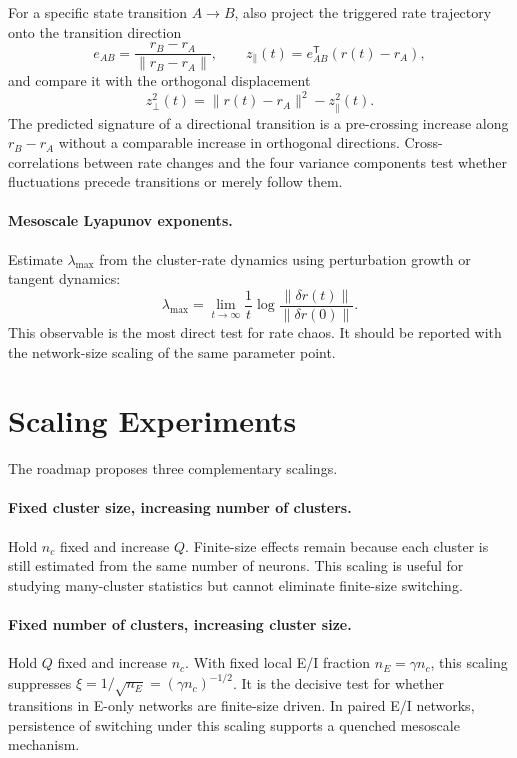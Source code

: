 For a specific state transition \(A\to B\), also project the triggered rate
trajectory onto the transition direction
\begin{equation}
    e_{AB}=\frac{r_B-r_A}{\|r_B-r_A\|},
    \qquad
    z_{\parallel}(t)=e_{AB}^{\mathsf T}(r(t)-r_A),
    \label{eq:ch10-transition-direction}
\end{equation}
and compare it with the orthogonal displacement
\begin{equation}
    z_{\perp}^2(t)
    =
    \|r(t)-r_A\|^2-z_{\parallel}^2(t).
    \label{eq:ch10-transition-orthogonal}
\end{equation}
The predicted signature of a directional transition is a pre-crossing increase
along \(r_B-r_A\) without a comparable increase in orthogonal directions.
Cross-correlations between rate changes and the four variance components test
whether fluctuations precede transitions or merely follow them.

\paragraph{Mesoscale Lyapunov exponents.}
Estimate \(\lambda_{\max}\) from the cluster-rate dynamics using perturbation
growth or tangent dynamics:
\begin{equation}
    \lambda_{\max}
    =
    \lim_{t\to\infty}
    \frac{1}{t}
    \log
    \frac{\|\delta r(t)\|}{\|\delta r(0)\|}.
    \label{eq:ch10-lyapunov}
\end{equation}
This observable is the most direct test for rate chaos. It should be reported
with the network-size scaling of the same parameter point.

\section{Scaling Experiments}
\label{sec:ch10-scaling-experiments}

The roadmap proposes three complementary scalings.

\paragraph{Fixed cluster size, increasing number of clusters.}
Hold \(n_c\) fixed and increase \(Q\). Finite-size effects remain because each
cluster is still estimated from the same number of neurons. This scaling is
useful for studying many-cluster statistics but cannot eliminate finite-size
switching.

\paragraph{Fixed number of clusters, increasing cluster size.}
Hold \(Q\) fixed and increase \(n_c\). With fixed local E/I fraction
\(n_E=\gamma n_c\), this scaling suppresses
\(\xi=1/\sqrt{n_E}=(\gamma n_c)^{-1/2}\). It is the decisive test for whether
transitions in E-only networks are finite-size driven. In paired E/I networks,
persistence of switching under this scaling supports a quenched mesoscale
mechanism.

